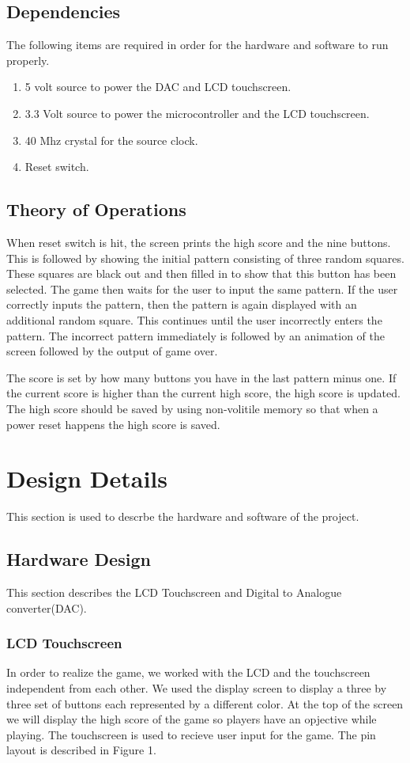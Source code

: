 \documentclass[draft]{article}
\begin{document}
\subsection{Dependencies}
The following items are required in order for the hardware  and software to run properly.
\begin{enumerate}
\item 5 volt source to power the DAC and LCD touchscreen.
\item 3.3 Volt source to power the microcontroller and the LCD touchscreen.
\item 40 Mhz crystal for the source clock.
\item Reset switch.
\end{enumerate}

\subsection{Theory of Operations}
When reset switch is hit, the screen prints the high score and the nine buttons.  This is followed by showing the initial pattern consisting of
three random squares.  These squares are black out and then filled in to show that this button has been selected.  The game then waits for
the user to input the same pattern.  If the user correctly inputs the pattern, then the pattern is again displayed with an additional random square.  This continues until the user incorrectly enters the pattern.  The incorrect pattern immediately is followed by an animation of the screen followed by the output of game over.
\par
\noindent
The score is set by how many buttons you have in the last pattern minus one.  If the current score is higher than the current high score, the high score is updated.  The high score should be saved by using non-volitile memory so that when a power reset happens the high score is saved.  

\section{Design Details}
This section is used to descrbe the hardware and software of the project.
\subsection{Hardware Design}
This section describes the LCD Touchscreen and Digital to Analogue converter(DAC).
\subsubsection{LCD Touchscreen}
In order to realize the game, we worked with the LCD and the touchscreen independent from each other.  We used the display screen to display a three by three set of buttons each represented by a different color.  At the top of the screen we will display the high score of the game so players have an opjective while playing.  The touchscreen is used to recieve user input for the game.  The pin layout is described in Figure 1.
\end{document}
